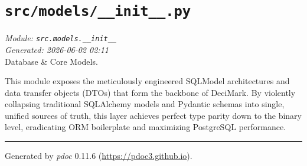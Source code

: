 
\section{\texttt{src/models/\_\_init\_\_.py}}
\textit{Module: \texttt{src.models.\_\_init\_\_}} \\
\textit{Generated: 2026-06-02 02:11} \\

Database \& Core Models.

This module exposes the meticulously engineered SQLModel architectures
and data transfer objects (DTOs) that form the backbone of DeciMark. By
violently collapsing traditional SQLAlchemy models and Pydantic schemas
into single, unified sources of truth, this layer achieves perfect type
parity down to the binary level, eradicating ORM boilerplate and
maximizing PostgreSQL performance.

\begin{center}\rule{0.5\linewidth}{0.5pt}
\end{center}

Generated by \emph{pdoc} 0.11.6 (\url{https://pdoc3.github.io}).
